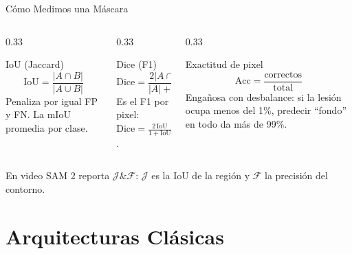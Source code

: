 \documentclass[aspectratio=169, 10pt]{beamer}
\begin{document}
\begin{frame}{C\'omo Medimos una M\'ascara}

	\begin{columns}[T]
		\begin{column}{0.33\textwidth}
			\begin{block}{IoU (Jaccard)}
				\small
				\[
				\text{IoU} = \frac{|A \cap B|}{|A \cup B|}
				\]
				Penaliza por igual FP y FN. La mIoU promedia por clase.
			\end{block}
		\end{column}

		\begin{column}{0.33\textwidth}
			\begin{block}{Dice (F1)}
				\small
				\[
				\text{Dice} = \frac{2|A \cap B|}{|A| + |B|}
				\]
				Es el F1 por pixel: $\text{Dice} = \frac{2\,\text{IoU}}{1 + \text{IoU}}$.
			\end{block}
		\end{column}

		\begin{column}{0.33\textwidth}
			\begin{block}{Exactitud de pixel}
				\small
				\[
				\text{Acc} = \frac{\text{correctos}}{\text{total}}
				\]
				Enga\~nosa con desbalance: si la lesi\'on ocupa menos del 1\%, predecir ``fondo'' en todo da m\'as de 99\%.
			\end{block}
		\end{column}
	\end{columns}

	\vspace{0.3cm}

	\begin{alertblock}{En video}
		SAM 2 reporta $\mathcal{J}\&\mathcal{F}$: $\mathcal{J}$ es la IoU de la regi\'on y $\mathcal{F}$ la precisi\'on del contorno.
	\end{alertblock}

\end{frame}

\section{Arquitecturas Cl\'asicas}
\end{document}
